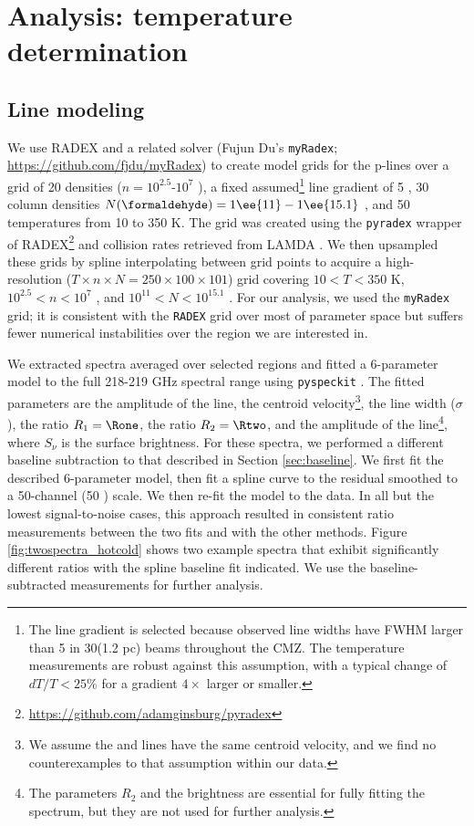 \section{Analysis: temperature determination}
\subsection{Line modeling}
\label{sec:linemodeling}
We use RADEX \citep{van-Der-Tak2007a} and a related solver (Fujun Du's
\texttt{myRadex}; \url{https://github.com/fjdu/myRadex}) to create model grids
for the p-\formaldehyde lines over a grid of 20 densities ($n=10^{2.5}$-$10^{7}$
\percc), a fixed assumed\footnote{The line gradient is selected because
observed line widths have FWHM larger than 5 \kms in 30\arcsec (1.2 pc) beams
throughout the CMZ.  The temperature measurements are
robust against this assumption, with a typical change of $dT/T < 25\%$ for a
gradient $4\times$ larger or smaller.} line gradient of 5
\perkmspc, 30 \formaldehyde column densities $N(\formaldehyde) =
1\ee{11}-1\ee{15.1}$ \persc, and 50
temperatures from 10 to 350 K.  The grid was created using the \texttt{pyradex}
wrapper of RADEX\footnote{\url{https://github.com/adamginsburg/pyradex}} and
collision rates retrieved from LAMDA \citep{Wiesenfeld2013a}.  We then
upsampled these grids by spline interpolating between grid points to acquire a
high-resolution ($T\times n \times N = 250\times100\times101$) grid covering
$10<T<350$ K, $10^{2.5} < n < 10^7$ \percc, and $10^{11} < N < 10^{15.1}$
\persc\perkmspc.  For our analysis, we used the \texttt{myRadex} grid; it is
consistent with the \texttt{RADEX} grid over most of parameter space but
suffers fewer numerical instabilities over the region we are interested in.

We extracted spectra averaged over selected regions and fitted
a 6-parameter model to the full 218-219 GHz spectral range using
\texttt{pyspeckit} \citep{Ginsburg2011c}.  The fitted parameters are the
amplitude of the \formaldehyde \threeohthree line, the centroid
velocity\footnote{We assume the \methanol and \formaldehyde lines have the same
centroid velocity, and we find no counterexamples to that assumption within our
data.}, the line width ($\sigma$), the ratio $R_1 = \Rone$, the ratio $R_2 =
\Rtwo$, and the
amplitude of the \methanol \fourtwotwo line\footnote{The parameters $R_2$ and
the \methanol brightness are essential for fully fitting the spectrum, but they
are not used for further analysis.}, where $S_\nu$ is the surface
brightness.  For these spectra, we performed a different baseline subtraction
to that described in Section
\ref{sec:baseline}.  We first fit the described 6-parameter model, then fit a
spline curve to the residual smoothed to a 50-channel (50 \kms) scale.  We then
re-fit the model to the data.  In all but the lowest signal-to-noise cases,
this approach resulted in consistent ratio measurements between the two fits
and with the other methods.  Figure \ref{fig:twospectra_hotcold} shows two
example spectra that exhibit significantly different ratios with the spline
baseline fit indicated.  We use the baseline-subtracted measurements for
further analysis.

